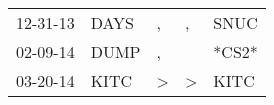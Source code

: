 \begin{supertabular}{lllll}
 12-31-13 &  DAYS &             , &             , &   SNUC \\
 02-09-14 &  DUMP &             , &               &  *CS2* \\
 03-20-14 &  KITC &  \textgreater &  \textgreater &   KITC \\
\end{supertabular}
